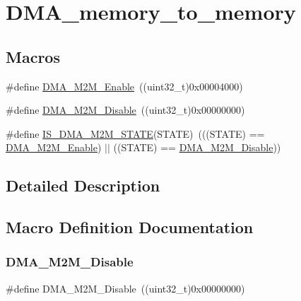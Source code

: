 \hypertarget{group___d_m_a__memory__to__memory}{}\section{D\+M\+A\+\_\+memory\+\_\+to\+\_\+memory}
\label{group___d_m_a__memory__to__memory}
\subsection*{Macros}
\begin{DoxyCompactItemize}
\item 
\#define \mbox{\hyperlink{group___d_m_a__memory__to__memory_ga046a1de15235c254c0511c08cae3065a}{D\+M\+A\+\_\+\+M2\+M\+\_\+\+Enable}}~((uint32\+\_\+t)0x00004000)
\item 
\#define \mbox{\hyperlink{group___d_m_a__memory__to__memory_ga86e0a7076f0badd509fac6576f3b5355}{D\+M\+A\+\_\+\+M2\+M\+\_\+\+Disable}}~((uint32\+\_\+t)0x00000000)
\item 
\#define \mbox{\hyperlink{group___d_m_a__memory__to__memory_gae0241d6265efc45f87b113cf44e50c06}{I\+S\+\_\+\+D\+M\+A\+\_\+\+M2\+M\+\_\+\+S\+T\+A\+TE}}(S\+T\+A\+TE)~(((S\+T\+A\+TE) == \mbox{\hyperlink{group___d_m_a__memory__to__memory_ga046a1de15235c254c0511c08cae3065a}{D\+M\+A\+\_\+\+M2\+M\+\_\+\+Enable}}) $\vert$$\vert$ ((S\+T\+A\+TE) == \mbox{\hyperlink{group___d_m_a__memory__to__memory_ga86e0a7076f0badd509fac6576f3b5355}{D\+M\+A\+\_\+\+M2\+M\+\_\+\+Disable}}))
\end{DoxyCompactItemize}


\subsection{Detailed Description}


\subsection{Macro Definition Documentation}
\mbox{\label{group___d_m_a__memory__to__memory_ga86e0a7076f0badd509fac6576f3b5355}} 
\subsubsection{\texorpdfstring{DMA\_M2M\_Disable}{DMA\_M2M\_Disable}}
{\footnotesize\ttfamily \#define D\+M\+A\+\_\+\+M2\+M\+\_\+\+Disable~((uint32\+\_\+t)0x00000000)}

